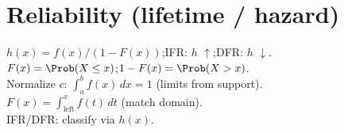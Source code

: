 \section*{Reliability (lifetime / hazard)}
$h(x)=f(x)/(1-F(x))$;\quad IFR: $h$ $\uparrow$;\quad DFR: $h$ $\downarrow$.\\
$F(x)=\Prob(X\le x)$;\quad $1-F(x)=\Prob(X>x)$.\\
Normalize $c$: $\int_a^b f(x)\,dx=1$ (limits from support).\\
$F(x)=\int_{\text{left}}^x f(t)\,dt$ (match domain).\\
IFR/DFR: classify via $h(x)$.
